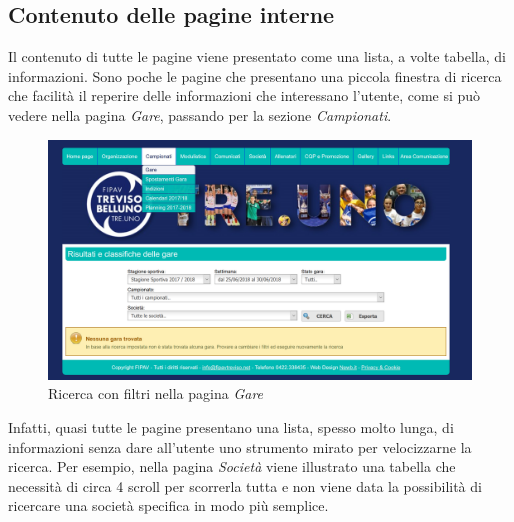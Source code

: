 	\subsection{Contenuto delle pagine interne}
	Il contenuto di tutte le pagine viene presentato come una lista, a volte tabella, 
	di informazioni. Sono poche le pagine che presentano una piccola finestra di 
	ricerca che facilità il reperire delle informazioni che interessano l'utente,
	come si può vedere nella pagina \textit{Gare}, passando per la sezione
	\textit{Campionati}.
	
	\begin{figure}[H]
	\centering
	\includegraphics[scale=0.6]{Images/ricerca.png}
	\caption{Ricerca con filtri nella pagina \textit{Gare}}
	\end{figure}
	
	Infatti, quasi tutte le pagine presentano una lista, spesso molto lunga, di 
	informazioni senza dare all'utente uno strumento mirato per velocizzarne la 
	ricerca. Per esempio, nella pagina \textit{Società} viene illustrato una tabella 
	che necessità di circa 4 scroll per scorrerla tutta e non viene data la
	possibilità di ricercare una società specifica in modo più semplice.
	
